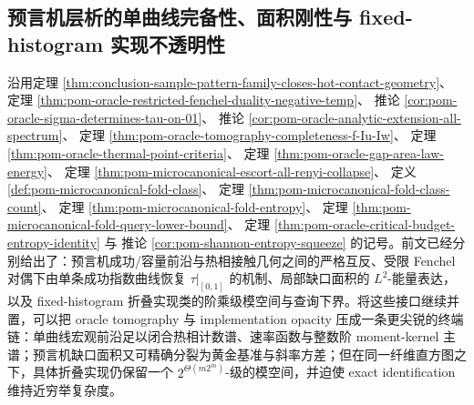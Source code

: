 \subsection{预言机层析的单曲线完备性、面积刚性与 fixed-histogram 实现不透明性}\label{subsec:conclusion-oracle-tomography-gap-area-fold-implementation-opacity}

沿用定理 \ref{thm:conclusion-sample-pattern-family-closes-hot-contact-geometry}、
定理 \ref{thm:pom-oracle-restricted-fenchel-duality-negative-temp}、
推论 \ref{cor:pom-oracle-sigma-determines-tau-on-01}、
推论 \ref{cor:pom-oracle-analytic-extension-all-spectrum}、
定理 \ref{thm:pom-oracle-tomography-completeness-f-Iu-Iw}、
定理 \ref{thm:pom-oracle-thermal-point-criteria}、
定理 \ref{thm:pom-oracle-gap-area-law-energy}、
定理 \ref{thm:pom-microcanonical-escort-all-renyi-collapse}、
定义 \ref{def:pom-microcanonical-fold-class}、
定理 \ref{thm:pom-microcanonical-fold-class-count}、
定理 \ref{thm:pom-microcanonical-fold-entropy}、
定理 \ref{thm:pom-microcanonical-fold-query-lower-bound}、
定理 \ref{thm:pom-oracle-critical-budget-entropy-identity} 与
推论 \ref{cor:pom-shannon-entropy-squeeze} 的记号。前文已经分别给出了：预言机成功/容量前沿与热相接触几何之间的严格互反、受限 Fenchel 对偶下由单条成功指数曲线恢复 \(\tau|_{[0,1]}\) 的机制、局部缺口面积的 \(L^2\)-能量表达，以及 fixed-histogram 折叠实现类的阶乘级模空间与查询下界。将这些接口继续并置，可以把 oracle tomography 与 implementation opacity 压成一条更尖锐的终端链：单曲线宏观前沿足以闭合热相计数谱、速率函数与整数阶 moment-kernel 主谱；预言机缺口面积又可精确分裂为黄金基准与斜率方差；但在同一纤维直方图之下，具体折叠实现仍保留一个 \(2^{\Theta(m2^m)}\)-级的模空间，并迫使 exact identification 维持近穷举复杂度。

